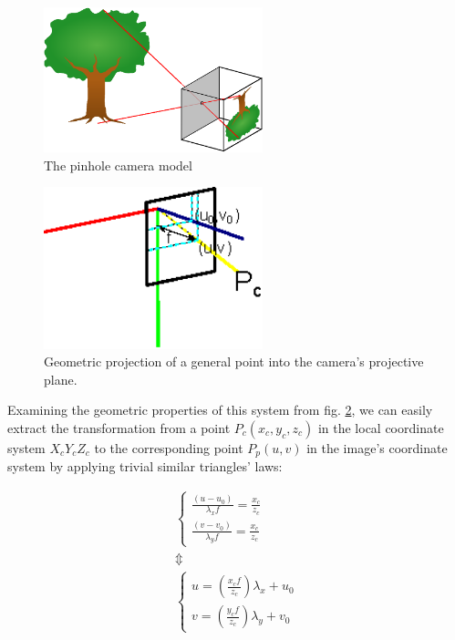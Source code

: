 \begin{figure}[htbp] \label{fig:pinhole_camera}
\centering
\includegraphics[width=2.5in]{./Graphics/pinhole_camera}
\caption{The pinhole camera model}
\end{figure}
\begin{figure}[htbp] \label{fig:intrinsics}
\centering
\includegraphics[width=2.5in]{./Graphics/camera_intrinsics}
\caption{Geometric projection of a general point into the camera's projective
plane.}
\end{figure}
Examining the geometric properties of this system from fig. \ref{fig:intrinsics}, we can easily extract the
transformation from a point $P_c(x_c,y_c,z_c)$ in the local coordinate system
$X_cY_cZ_c$ to the corresponding point $P_p(u,v)$ in the image's coordinate
system by applying trivial similar triangles' laws:

\[
  \begin{array}{c}
    \left\{\begin{array}{c}
    \frac{(u-u_0)}{\lambda _x f}=\frac{x_c}{z_c} \\
    \frac{(v-v_0)}{\lambda _y f}=\frac{x_c}{z_c}
  \end{array}
  \right. \\
  \Updownarrow \\
  \left\{\begin{array}{c}
      u=\left(\frac{x_c f}{z_c}\right) \lambda _x+u_0 \\
      v=\left(\frac{y_c f}{z_c}\right) \lambda _y+v_0
    \end{array}
    \right. 
  \end{array}
\]

